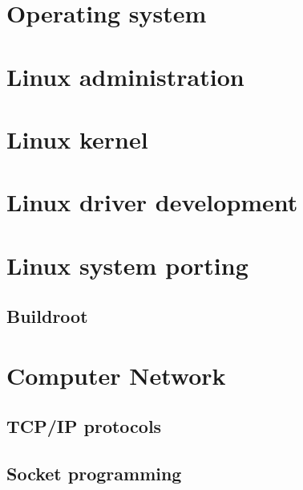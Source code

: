 \documentclass[UTF8]{book}
\begin{document}
	\begin{comment} 
	rather stupid, but helpful 
	\chapter{Microcontroller}
	\chapter{Digital signal processor}
	\chapter{ARM processor}
	\end{comment}

	\part{Operating system}
	
	\part{Linux administration}
	
	\part{Linux kernel}
	
	\part{Linux driver development}
	
	\part{Linux system porting}
	\chapter{Buildroot}
	
	\part{Computer Network}
	\chapter{TCP/IP protocols}
	\chapter{Socket programming}
	
\end{document}
